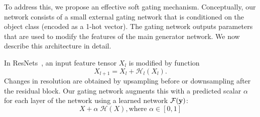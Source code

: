 To address this, we propose an effective soft gating mechanism.
Conceptually, our network consists of a small external gating network that is conditioned on the object class (encoded as a 1-hot vector).
The gating network outputs parameters that are used to modify the features of the main generator network.
We now describe this architecture in detail.



In ResNets~\cite{he2016deep}, an input feature tensor $X_l$ is modified by function
\begin{equation}
X_{l+1} = X_l+\mathcal{H}_l(X_l).
\end{equation}
Changes in resolution are obtained by upsampling before or downsampling after the residual block.
Our gating network augments this with a predicted scalar $\alpha$ for each layer of the network using a learned network $\mathcal{F}({\bf y})$:
\begin{equation}
X + \alpha \; \mathcal{H}(X), \text{where } \alpha \in [0,1]
\end{equation}

